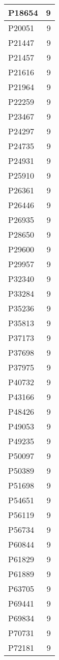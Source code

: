 \documentclass[
]{book}
\theoremstyle{definition}
\theoremstyle{definition}
\theoremstyle{definition}
\theoremstyle{definition}
\theoremstyle{remark}
\begin{document}
\begin{table}
\begin{tabular}{l|r}
\hline
P18654 & 9\\
\hline
P20051 & 9\\
\hline
P21447 & 9\\
\hline
P21457 & 9\\
\hline
P21616 & 9\\
\hline
P21964 & 9\\
\hline
P22259 & 9\\
\hline
P23467 & 9\\
\hline
P24297 & 9\\
\hline
P24735 & 9\\
\hline
P24931 & 9\\
\hline
P25910 & 9\\
\hline
P26361 & 9\\
\hline
P26446 & 9\\
\hline
P26935 & 9\\
\hline
P28650 & 9\\
\hline
P29600 & 9\\
\hline
P29957 & 9\\
\hline
P32340 & 9\\
\hline
P33284 & 9\\
\hline
P35236 & 9\\
\hline
P35813 & 9\\
\hline
P37173 & 9\\
\hline
P37698 & 9\\
\hline
P37975 & 9\\
\hline
P40732 & 9\\
\hline
P43166 & 9\\
\hline
P48426 & 9\\
\hline
P49053 & 9\\
\hline
P49235 & 9\\
\hline
P50097 & 9\\
\hline
P50389 & 9\\
\hline
P51698 & 9\\
\hline
P54651 & 9\\
\hline
P56119 & 9\\
\hline
P56734 & 9\\
\hline
P60844 & 9\\
\hline
P61829 & 9\\
\hline
P61889 & 9\\
\hline
P63705 & 9\\
\hline
P69441 & 9\\
\hline
P69834 & 9\\
\hline
P70731 & 9\\
\hline
P72181 & 9\\

\end{tabular}
\end{table}
\end{document}
